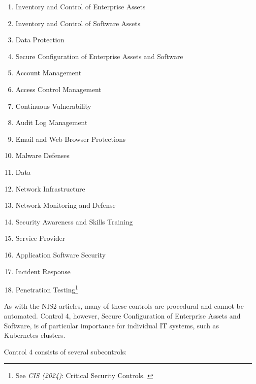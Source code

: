 \begin{enumerate}
    \item Inventory and Control of Enterprise Assets
    \item Inventory and Control of Software Assets
    \item Data Protection
    \item Secure Configuration of Enterprise Assets and Software
    \item Account Management
    \item Access Control Management
    \item Continuous Vulnerability
    \item Audit Log Management
    \item Email and Web Browser Protections
    \item Malware Defenses
    \item Data
    \item Network Infrastructure
    \item Network Monitoring and Defense
    \item Security Awareness and Skills Training
    \item Service Provider
    \item Application Software Security
    \item Incident Response
    \item Penetration Testing\footnote{See \textit{CIS (2024)}: Critical Security Controls. \cite{cisControls}}
\end{enumerate}

As with the NIS2 articles, many of these controls are procedural and cannot be automated. Control 4, however, Secure Configuration of Enterprise Assets and Software, is of particular importance for individual IT systems, such as Kubernetes clusters.

Control 4 consists of several subcontrols:

